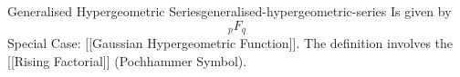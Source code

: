 \begin{definition}{Generalised Hypergeometric Series}{generalised-hypergeometric-series}
  Is given by \[_pF_q\] Special Case: {[}{[}Gaussian Hypergeometric
  Function{]}{]}. The definition involves the {[}{[}Rising Factorial{]}{]}
  (Pochhammer Symbol).
\end{definition}
